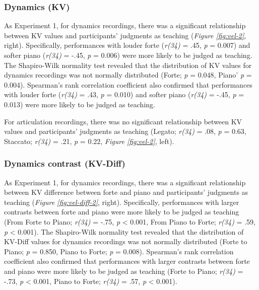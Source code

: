 \documentclass[
  man,floatsintext]{apa6}
\begin{document}
\hypertarget{dynamics-kv-1}{%
\subsubsection{Dynamics (KV)}\label{dynamics-kv-1}}

As Experiment 1, for dynamics recordings, there was a significant relationship between KV values and participants' judgments as teaching (\emph{Figure \ref{fig:vel-2}}, right). Specifically, performances with louder forte (\emph{r(34)} = .45, \emph{p} = 0.007) and softer piano (\emph{r(34)} = -.45, \emph{p} = 0.006) were more likely to be judged as teaching. The Shapiro-Wilk normality test revealed that the distribution of KV values for dynamics recordings was not normally distributed (Forte; \emph{p} = 0.048, Piano' \emph{p} = 0.004). Spearman's rank correlation coefficient also confirmed that performances with louder forte (\emph{r(34)} = .43, \emph{p} = 0.010) and softer piano (\emph{r(34)} = -.45, \emph{p} = 0.013) were more likely to be judged as teaching.

For articulation recordings, there was no significant relationship between KV values and participants' judgments as teaching (Legato; \emph{r(34)} = .08, \emph{p} = 0.63, Staccato; \emph{r(34)} = .21, \emph{p} = 0.22, \emph{Figure \ref{fig:vel-2}}, left).

\hypertarget{dynamics-contrast-kv-diff-1}{%
\subsubsection{Dynamics contrast (KV-Diff)}\label{dynamics-contrast-kv-diff-1}}

As Experiment 1, for dynamics recordings, there was a significant relationship between KV difference between forte and piano and participants' judgments as teaching (\emph{Figure \ref{fig:vel-diff-2}}, right). Specifically, performances with larger contrasts between forte and piano were more likely to be judged as teaching (From Forte to Piano; \emph{r(34)} = -.75, \emph{p} \textless{} 0.001, From Piano to Forte; \emph{r(34)} = .59, \emph{p} \textless{} 0.001). The Shapiro-Wilk normality test revealed that the distribution of KV-Diff values for dynamics recordings was not normally distributed (Forte to Piano; \emph{p} = 0.850, Piano to Forte; \emph{p} = 0.008). Spearman's rank correlation coefficient also confirmed that performances with larger contrasts between forte and piano were more likely to be judged as teaching (Forte to Piano; \emph{r(34)} = -.73, \emph{p} \textless{} 0.001, Piano to Forte; \emph{r(34)} = .57, \emph{p} \textless{} 0.001).
\end{document}
